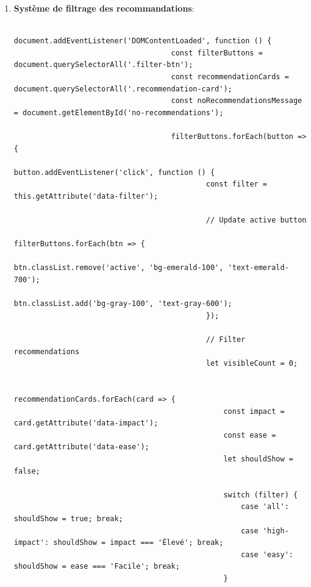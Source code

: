 \documentclass[a4paper,11pt]{article}
\begin{document}
\begin{enumerate}
                    \item \textbf{Système de filtrage des recommandations}:
                        \begin{tcolorbox}[colback=lightgray!6, colframe=black, left=-65mm, right=5mm, top=2mm, bottom=0mm, boxrule=0.1mm]
                            \begin{verbatim}
                                document.addEventListener('DOMContentLoaded', function () {
                                    const filterButtons = document.querySelectorAll('.filter-btn');
                                    const recommendationCards = document.querySelectorAll('.recommendation-card');
                                    const noRecommendationsMessage = document.getElementById('no-recommendations');

                                    filterButtons.forEach(button => {
                                        button.addEventListener('click', function () {
                                            const filter = this.getAttribute('data-filter');

                                            // Update active button
                                            filterButtons.forEach(btn => {
                                                btn.classList.remove('active', 'bg-emerald-100', 'text-emerald-700');
                                                btn.classList.add('bg-gray-100', 'text-gray-600');
                                            });

                                            // Filter recommendations
                                            let visibleCount = 0;

                                            recommendationCards.forEach(card => {
                                                const impact = card.getAttribute('data-impact');
                                                const ease = card.getAttribute('data-ease');
                                                let shouldShow = false;

                                                switch (filter) {
                                                    case 'all': shouldShow = true; break;
                                                    case 'high-impact': shouldShow = impact === 'Élevé'; break;
                                                    case 'easy': shouldShow = ease === 'Facile'; break;
                                                }


\end{verbatim}
\end{tcolorbox}
\end{enumerate}
\end{document}
